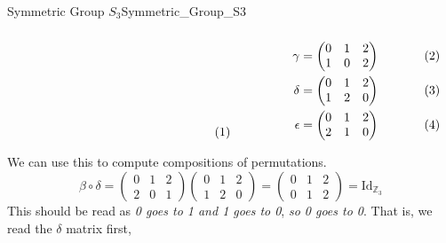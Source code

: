 \begin{lexample}{Symmetric Group $S_{3}$}{Symmetric_Group_S3}
\begin{subequations}
\begin{minipage}[b]{0.49\textwidth}
\begin{align}
                \end{align}
            \end{minipage}
            \hfill
            \begin{minipage}[b]{0.49\textwidth}
                \centering
                \begin{align}
                    \gamma&=
                    \begin{pmatrix}
                        0&1&2\\
                        1&0&2
                    \end{pmatrix}\\
                    \delta&=
                    \begin{pmatrix}
                        0&1&2\\
                        1&2&0
                    \end{pmatrix}\\
                    \epsilon&=
                    \begin{pmatrix}
                        0&1&2\\
                        2&1&0
                    \end{pmatrix}
                \end{align}
            \end{minipage}
        \end{subequations}
        \par\vspace{2.5ex}
        We can use this to compute compositions of permutations.
        \begin{equation}
            \beta\circ\delta=
            \begin{pmatrix}
                0&1&2\\
                2&0&1
            \end{pmatrix}
            \begin{pmatrix}
                0&1&2\\
                1&2&0
            \end{pmatrix}=
            \begin{pmatrix}
                0&1&2\\
                0&1&2
            \end{pmatrix}
            =\textrm{Id}_{\mathbb{Z}_{3}}
        \end{equation}
        This should be read as \textit{0 goes to 1 and 1 goes to 0},
        \textit{so 0 goes to 0}. That is, we read the $\delta$ matrix first,

\end{lexample}
